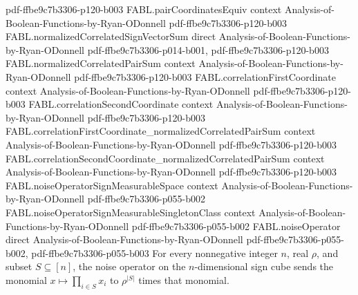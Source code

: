 \begin{theorem}
  {pdf-ffbe9c7b3306-p120-b003}
\proofstep
  {FABL.pairCoordinatesEquiv}
  {context}
  {Analysis-of-Boolean-Functions-by-Ryan-ODonnell}
  {pdf-ffbe9c7b3306-p120-b003}
\proofstep
  {FABL.normalizedCorrelatedSignVectorSum}
  {direct}
  {Analysis-of-Boolean-Functions-by-Ryan-ODonnell}
  {pdf-ffbe9c7b3306-p014-b001,
    pdf-ffbe9c7b3306-p120-b003}
\proofstep
  {FABL.normalizedCorrelatedPairSum}
  {context}
  {Analysis-of-Boolean-Functions-by-Ryan-ODonnell}
  {pdf-ffbe9c7b3306-p120-b003}
\proofstep
  {FABL.correlationFirstCoordinate}
  {context}
  {Analysis-of-Boolean-Functions-by-Ryan-ODonnell}
  {pdf-ffbe9c7b3306-p120-b003}
\proofstep
  {FABL.correlationSecondCoordinate}
  {context}
  {Analysis-of-Boolean-Functions-by-Ryan-ODonnell}
  {pdf-ffbe9c7b3306-p120-b003}
\proofstep
  {FABL.correlationFirstCoordinate_normalizedCorrelatedPairSum}
  {context}
  {Analysis-of-Boolean-Functions-by-Ryan-ODonnell}
  {pdf-ffbe9c7b3306-p120-b003}
\proofstep
  {FABL.correlationSecondCoordinate_normalizedCorrelatedPairSum}
  {context}
  {Analysis-of-Boolean-Functions-by-Ryan-ODonnell}
  {pdf-ffbe9c7b3306-p120-b003}
\proofstep
  {FABL.noiseOperatorSignMeasurableSpace}
  {context}
  {Analysis-of-Boolean-Functions-by-Ryan-ODonnell}
  {pdf-ffbe9c7b3306-p055-b002}
\proofstep
  {FABL.noiseOperatorSignMeasurableSingletonClass}
  {context}
  {Analysis-of-Boolean-Functions-by-Ryan-ODonnell}
  {pdf-ffbe9c7b3306-p055-b002}
\proofstep
  {FABL.noiseOperator}
  {direct}
  {Analysis-of-Boolean-Functions-by-Ryan-ODonnell}
  {pdf-ffbe9c7b3306-p055-b002,
    pdf-ffbe9c7b3306-p055-b003}
For every nonnegative integer $n$, real $\rho$, and subset $S\subseteq[n]$, the noise
operator on the $n$-dimensional sign cube sends the monomial $x\mapsto\prod_{i\in S}x_i$
to $\rho^{|S|}$ times that monomial.
\end{theorem}

